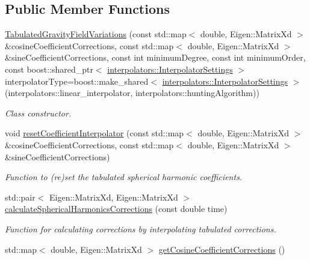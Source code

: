 \subsection*{Public Member Functions}
\begin{DoxyCompactItemize}
\item 
\hyperlink{classtudat_1_1gravitation_1_1TabulatedGravityFieldVariations_a3ce6efb7e228d0d4e1ece69c32f2e908}{Tabulated\+Gravity\+Field\+Variations} (const std\+::map$<$ double, Eigen\+::\+Matrix\+Xd $>$ \&cosine\+Coefficient\+Corrections, const std\+::map$<$ double, Eigen\+::\+Matrix\+Xd $>$ \&sine\+Coefficient\+Corrections, const int minimum\+Degree, const int minimum\+Order, const boost\+::shared\+\_\+ptr$<$ \hyperlink{classtudat_1_1interpolators_1_1InterpolatorSettings}{interpolators\+::\+Interpolator\+Settings} $>$ interpolator\+Type=boost\+::make\+\_\+shared$<$ \hyperlink{classtudat_1_1interpolators_1_1InterpolatorSettings}{interpolators\+::\+Interpolator\+Settings} $>$(interpolators\+::linear\+\_\+interpolator, interpolators\+::hunting\+Algorithm))
\begin{DoxyCompactList}\small\item\em Class constructor. \end{DoxyCompactList}\item 
void \hyperlink{classtudat_1_1gravitation_1_1TabulatedGravityFieldVariations_af70f276545a56cf413c4368a59b915d8}{reset\+Coefficient\+Interpolator} (const std\+::map$<$ double, Eigen\+::\+Matrix\+Xd $>$ \&cosine\+Coefficient\+Corrections, const std\+::map$<$ double, Eigen\+::\+Matrix\+Xd $>$ \&sine\+Coefficient\+Corrections)
\begin{DoxyCompactList}\small\item\em Function to (re)set the tabulated spherical harmonic coefficients. \end{DoxyCompactList}\item 
std\+::pair$<$ Eigen\+::\+Matrix\+Xd, Eigen\+::\+Matrix\+Xd $>$ \hyperlink{classtudat_1_1gravitation_1_1TabulatedGravityFieldVariations_a58abfadc1b7268a7465da6990dfbf280}{calculate\+Spherical\+Harmonics\+Corrections} (const double time)
\begin{DoxyCompactList}\small\item\em Function for calculating corrections by interpolating tabulated corrections. \end{DoxyCompactList}\item 
std\+::map$<$ double, Eigen\+::\+Matrix\+Xd $>$ \hyperlink{classtudat_1_1gravitation_1_1TabulatedGravityFieldVariations_af2b4499893adb532e1abfa4f17a9000a}{get\+Cosine\+Coefficient\+Corrections} ()

\end{DoxyCompactItemize}
